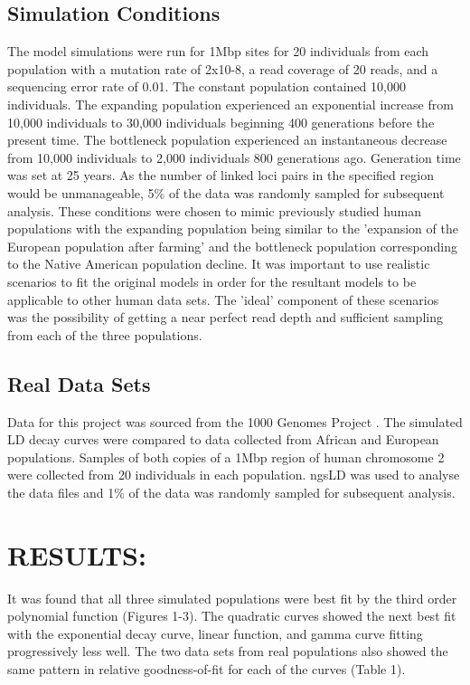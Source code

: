 \documentclass[11pt]{article}
\begin{document}
\begin{linenumbers}
\subsection{Simulation Conditions}
The model simulations were run for 1Mbp sites for 20 individuals from each population with a mutation rate of 2x10-8, a read coverage of 20 reads, and a sequencing error rate of 0.01. The constant population contained 10,000 individuals. The expanding population experienced an exponential increase from 10,000 individuals to 30,000 individuals beginning 400 generations before the present time. The bottleneck population experienced an instantaneous decrease from 10,000 individuals to 2,000 individuals 800 generations ago. Generation time was set at 25 years. As the number of linked loci pairs in the specified region would be unmanageable, 5\% of the data was randomly sampled for subsequent analysis. These conditions were chosen to mimic previously studied human populations with the expanding population being similar to the 'expansion of the European population after farming' and the bottleneck population corresponding to the Native American population decline. It was important to use realistic scenarios to fit the original models in order for the resultant models to be applicable to other human data sets. The 'ideal' component of these scenarios was the possibility of getting a near perfect read depth and sufficient sampling from each of the three populations.

\subsection{Real Data Sets}
Data for this project was sourced from the 1000 Genomes Project \citep{10002015global}. The simulated LD decay curves were compared to data collected from African and European populations. Samples of both copies of a 1Mbp region of human chromosome 2 were collected from 20 individuals in each population. ngsLD was used to analyse the data files and 1\% of the data was randomly sampled for subsequent analysis.     

\section{RESULTS:}
It was found that all three simulated populations were best fit by the third order polynomial function (Figures 1-3). The quadratic curves showed the next best fit with the exponential decay curve, linear function, and gamma curve fitting progressively less well. The two data sets from real populations also showed the same pattern in relative goodness-of-fit for each of the curves (Table 1).   


\end{linenumbers}
\end{document}
